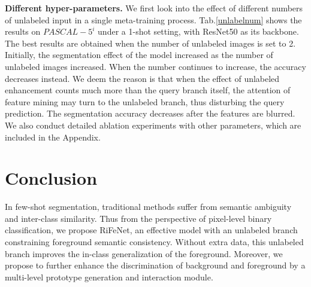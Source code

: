 \documentclass[letterpaper]{article} %
\begin{document}
\begin{table}[!t]
\centering
\begin{threeparttable}
\end{threeparttable}
\caption{Ablation studies of different numbers of unlabeled images in the single meta-training process.}
\label{unlabelnum}
\end{table}

\textbf{Different hyper-parameters.} We first look into the effect of different numbers of unlabeled input in a single meta-training process. Tab.\ref{unlabelnum} shows the results on $PASCAL-5^i$ under a 1-shot setting, with ResNet50 as its backbone. The best results are obtained when the number of unlabeled images is set to 2. Initially, the segmentation effect of the model increased as the number of unlabeled images increased. When the number continues to increase, the accuracy decreases instead. We deem the reason is that when the effect of unlabeled enhancement counts much more than the query branch itself, the attention of feature mining may turn to the unlabeled branch, thus disturbing the query prediction. The segmentation accuracy decreases after the features are blurred. We also conduct detailed ablation experiments with other parameters, which are included in the Appendix.


\vspace{-3.84mm}
\section{Conclusion}
In few-shot segmentation, traditional methods suffer from semantic ambiguity and inter-class similarity. Thus from the perspective of pixel-level binary classification, we propose RiFeNet, an effective model with an unlabeled branch constraining foreground semantic consistency. Without extra data, this unlabeled branch improves the in-class generalization of the foreground. Moreover, we propose to further enhance the discrimination of background and foreground by a multi-level prototype generation and interaction module.
\end{document}
